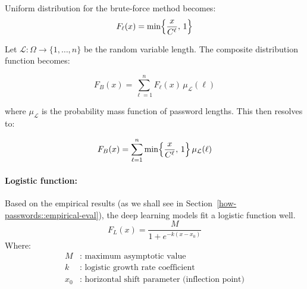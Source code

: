 Uniform distribution for the brute-force method becomes:
\begin{equation}
    F_{\ell}(x) = \min \Bigl\{ \frac{x}{C^\ell},\,1 \Bigl\}
\end{equation}

Let $\mathcal{L}: \Omega \to \{1,\ldots,n\}$ be the random variable length. The composite distribution function becomes:

\begin{equation}
F_B(x) = \sum_{\ell=1}^n F_\ell(x) \, \mu_{\mathcal{L}}(\ell)
\end{equation}

where $\mu_{\mathcal{L}}$ is the probability mass function of password lengths. This then resolves to:

\begin{equation}
F_B(x) = \sum_{\ell=1}^n \min \Bigl\{ \frac{x}{C^\ell},\,1 \Bigl\} \, \mu_{\mathcal{L}}(\ell)
\end{equation}

% 
% 
% 
% 
% 
% 

\paragraph{Logistic function:}

Based on the empirical results (as we shall see in Section~\ref{how-passwords::empirical-eval}), the deep learning models fit a logistic function well.
\begin{equation}
    F_L(x) = \frac{M}{1 + e^{-k(x-x_0)}}
\end{equation}
Where:
\begin{align*}
M & : \text{ maximum asymptotic value} \\
k & : \text{ logistic growth rate coefficient} \\
x_0  & : \text{ horizontal shift parameter (inflection point)} \\
\end{align*}

